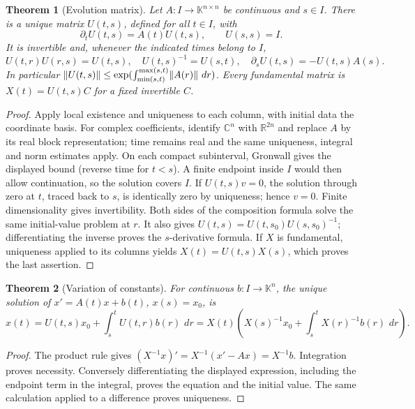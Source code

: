 \documentclass[11pt,oneside]{book}
\newtheorem{theorem}{Theorem}[chapter]
\theoremstyle{definition}
\theoremstyle{remark}\newtheorem{remark}[theorem]{Remark}
\newcommand{\R}{\mathbb R}\newcommand{\C}{\mathbb C}
\newcommand{\dd}{\,d}\newcommand{\id}{\operatorname{id}}
\begin{document}
\begin{theorem}[Evolution matrix]\label{d13:07:fundamental}
Let \(A:I\to\mathbb K^{n\times n}\) be continuous and \(s\in I\).
There is a unique matrix \(U(t,s)\), defined for all \(t\in I\), with
\[
 \partial_tU(t,s)=A(t)U(t,s),\qquad U(s,s)=I .
\]
It is invertible and, whenever the indicated times belong to \(I\),
\[
 U(t,r)U(r,s)=U(t,s),\quad U(t,s)^{-1}=U(s,t),\quad
 \partial_sU(t,s)=-U(t,s)A(s).
\]
In particular
\(\norm{U(t,s)}\le\exp(\int_{\min(s,t)}^{\max(s,t)}\norm{A(r)}\,\dd r)\).
Every fundamental matrix is \(X(t)=U(t,s)C\) for a fixed invertible \(C\).
\end{theorem}
\begin{proof}
Apply local existence and uniqueness to each column, with initial data the
coordinate basis. For complex coefficients, identify \(\C^n\) with
\(\R^{2n}\) and replace \(A\) by its real block representation; time remains
real and the same uniqueness, integral and norm estimates apply.
On each compact subinterval, Gronwall gives the displayed
bound (reverse time for \(t<s\)). A finite endpoint inside \(I\) would then
allow continuation, so the solution covers \(I\).
If \(U(t,s)v=0\), the solution through zero at \(t\), traced back to \(s\),
is identically zero by uniqueness; hence \(v=0\). Finite dimensionality
gives invertibility. Both sides of the composition formula solve the same
initial-value problem at \(r\). It also gives
\(U(t,s)=U(t,s_0)U(s,s_0)^{-1}\); differentiating the inverse proves the
\(s\)-derivative formula. If \(X\) is fundamental, uniqueness applied to its
columns yields \(X(t)=U(t,s)X(s)\), which proves the last assertion.
\end{proof}

\begin{theorem}[Variation of constants]\label{d13:07:variation}
For continuous \(b:I\to\mathbb K^n\), the unique solution of
\(x'=A(t)x+b(t)\), \(x(s)=x_0\), is
\[
 x(t)=U(t,s)x_0+\int_s^t U(t,r)b(r)\,\dd r
     =X(t)\left(X(s)^{-1}x_0+\int_s^t X(r)^{-1}b(r)\,\dd r\right).
\]
\end{theorem}
\begin{proof}
The product rule gives
\((X^{-1}x)'=X^{-1}(x'-Ax)=X^{-1}b\). Integration proves necessity.
Conversely differentiating the displayed expression, including the endpoint
term in the integral, proves the equation and the initial value. The same
calculation applied to a difference proves uniqueness.
\end{proof}
\end{document}

